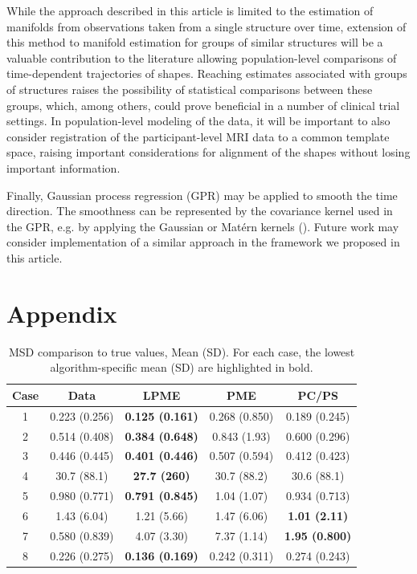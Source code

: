 \documentclass[11pt,reqno]{article}
\theoremstyle{definition}
\begin{document}
While the approach described in this article is limited to the estimation of manifolds from observations taken from a single structure over time, extension of this method to manifold estimation for groups of similar structures will be a valuable contribution to the literature allowing population-level comparisons of time-dependent trajectories of shapes. Reaching estimates associated with groups of structures raises the possibility of statistical comparisons between these groups, which, among others, could prove beneficial in a number of clinical trial settings. In population-level modeling of the data, it will be important to also consider registration of the participant-level MRI data to a common template space, raising important considerations for alignment of the shapes without losing important information.

Finally, Gaussian process regression (GPR) may be applied to smooth the time direction. The smoothness can be represented by the covariance kernel used in the GPR, e.g. by applying the Gaussian or Matérn kernels (\cite{dunsonInferringManifoldsNoisy2022}). Future work may consider implementation of a similar approach in the framework we proposed in this article. 

\newpage

\nocite{*}
%
%
\printbibliography

\newpage

\appendix

\section*{Appendix}

\begin{table}[h]
  \centering
  \begin{tabular}{|c c c c c|}
    \hline
    Case & Data & LPME & PME & PC/PS \\
    \hline
    1 & 0.223 (0.256) & {\bf 0.125 (0.161)} & 0.268 (0.850) & 0.189 (0.245) \\
    2 & 0.514 (0.408) & {\bf 0.384 (0.648)} & 0.843 (1.93) & 0.600 (0.296) \\
    3 & 0.446 (0.445) & {\bf 0.401 (0.446)} & 0.507 (0.594) & 0.412 (0.423) \\
    4 & 30.7 (88.1) & {\bf 27.7 (260)} & 30.7 (88.2) & 30.6 (88.1) \\
    5 & 0.980 (0.771) & {\bf 0.791 (0.845)} & 1.04 (1.07) & 0.934 (0.713) \\
    6 & 1.43 (6.04) & 1.21 (5.66) & 1.47 (6.06) & {\bf 1.01 (2.11)} \\
    7 & 0.580 (0.839) & 4.07 (3.30) & 7.37 (1.14) & {\bf 1.95 (0.800)} \\
    8 & 0.226 (0.275) & {\bf 0.136 (0.169)} & 0.242 (0.311) & 0.274 (0.243) \\
    \hline
  \end{tabular}
  \caption{MSD comparison to true values, Mean (SD). For each case, the lowest algorithm-specific mean (SD) are highlighted in bold. }
  \label{table:simulation_results_mean}
\end{table}
\end{document}
